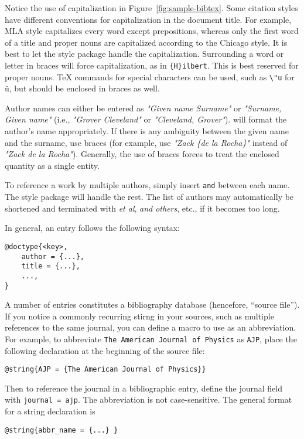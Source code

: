Notice the use of capitalization in Figure~\ref{fig:sample-bibtex}.
Some citation styles have different conventions for capitalization in
the document title.  For example, MLA style capitalizes every word
except prepositions, whereas only the first word of a title and proper
nouns are capitalized according to the Chicago style.  It is best to
let the style package handle the capitalization.  Surrounding a word
or letter in braces will force capitalization, as in
\texttt{\{H\}ilbert}.  This is best reserved for proper nouns.  \TeX{}
commands for special characters can be used, such as \verb|\"u| for
\"u, but should be enclosed in braces as well.

Author names can either be entered as \textit{"Given name Surname"} or
\textit{"Surname, Given name"} (i.e., \textit{"Grover Cleveland"} or
\textit{"Cleveland, Grover"}).  \BibTeX{} will format the author's
name appropriately.  If there is any ambiguity between the given name
and the surname, use braces (for example, use \textit{"Zack \{de la
  Rocha\}"} instead of \textit{"Zack de la Rocha"}).  Generally, the
use of braces forces \BibTeX{} to treat the enclosed quantity as a
single entity.

To reference a work by multiple authors, simply insert \texttt{and}
between each name.  The style package will handle the rest.  The list
of authors may automatically be shortened and terminated with
\textit{et al}, \textit{and others}, etc., if it becomes too long.

In general, an entry follows the following syntax:
\begin{verbatim}
@doctype{<key>,
    author = {...},
    title = {...},
    ...,
}
\end{verbatim}

A number of entries constitutes a bibliography database (hencefore,
``source file'').  If you notice a commonly recurring stirng in your
sources, such as multiple references to the same journal, you can
define a macro to use as an abbreviation.  For example, to abbreviate
\texttt{The American Journal of Physics} as \texttt{AJP}, place the
following declaration at the beginning of the source file:
\begin{verbatim}
@string{AJP = {The American Journal of Physics}}
\end{verbatim}

Then to reference the journal in a bibliographic entry, define the
journal field with \texttt{journal = ajp}.  The abbreviation is not
case-sensitive.  The general format for a string declaration is
\begin{verbatim}
@string{abbr_name = {...} }
\end{verbatim}

